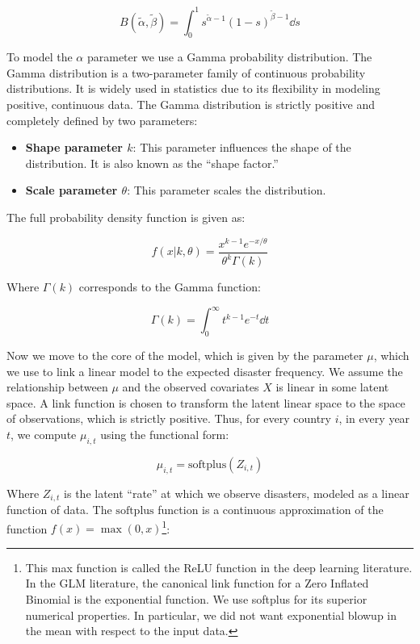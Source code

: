 \begin{equation}
B(\tilde{\alpha}, \tilde{\beta}) = \int_0^1 s^{\tilde{\alpha}-1} (1-s)^{\tilde{\beta}-1} \dd s
\end{equation}

To model the $\alpha$ parameter we use a Gamma probability distribution. The Gamma distribution is a two-parameter family of continuous probability distributions. It is widely used in statistics due to its flexibility in modeling positive, continuous data. The Gamma distribution is strictly positive and completely defined by two parameters:

\begin{itemize}
    \item \textbf{Shape parameter $k$}: This parameter influences the shape of the distribution. It is also known as the ``shape factor.''
    \item \textbf{Scale parameter $\theta$}: This parameter scales the distribution.
\end{itemize}

The full probability density function is given as:

\begin{equation}
f(x|k, \theta) = \frac{x^{k-1} e^{-x/\theta}}{\theta^k \Gamma(k)}
\end{equation}

Where $\Gamma(k)$ corresponds to the Gamma function:

\begin{equation}
\Gamma(k) = \int_0^{\infty} t^{k-1} e^{-t} \dd t
\end{equation}

Now we move to the core of the model, which is given by the parameter $\mu$, which we use to link a linear model to the expected disaster frequency. We assume the relationship between $\mu$ and the observed covariates $X$ is linear in some latent space. A link function is chosen to transform the latent linear space to the space of observations, which is strictly positive. Thus, for every country $i$, in every year $t$, we compute $\mu_{i,t}$ using the functional form:

\begin{equation}
\mu_{i,t} = \text{softplus}(Z_{i,t})
\end{equation}

Where $Z_{i,t}$ is the latent ``rate'' at which we observe disasters, modeled as a linear function of data. The $\text{softplus}$ function is a continuous approximation of the function $f(x) = \max(0, x)$\footnote{This max function is called the ReLU function in the deep learning literature. In the GLM literature, the canonical link function for a Zero Inflated Binomial is the exponential function. We use softplus for its superior numerical properties. In particular, we did not want exponential blowup in the mean with respect to the input data.}:

